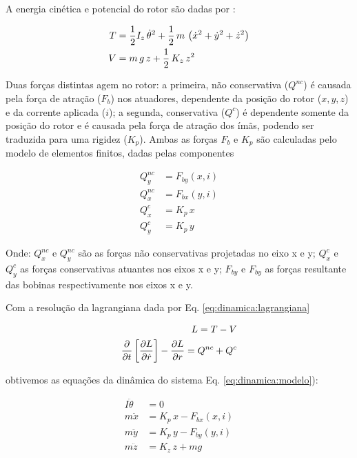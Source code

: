  A energia cinética e potencial do rotor são dadas por :
 
 \begin{align}
 	T &= \frac{1}{2} I_z \, \dot{\theta}^2 + \frac{1}{2} \, m \, \left( \dot{x}^2 + \dot{y}^2 + \dot{z}^2 \right) \notag \\
 	V &= m \, g \, z + \frac{1}{2} \, K_z \, z^2
 \end{align}	
 	
 Duas forças distintas agem no rotor: a primeira, não conservativa ($Q^{nc}$) é causada pela força de atração ($F_b$) nos atuadores, dependente da posição do rotor ($x,y,z$) e da corrente aplicada ($i$); a segunda, conservativa ($Q^{c}$) é dependente somente da posição do rotor e é causada pela força de atração dos ímãs, podendo ser traduzida para uma rigidez ($K_p$). Ambas as forças $F_b$ e $K_p$ são calculadas pelo modelo de elementos finitos, dadas pelas componentes 
	 	
 \begin{align}
 	Q_y^{nc} &= F_{by}(x,i)  \\
 	Q_x^{nc} &= F_{bx}(y,i)  \\
 	Q^{c}_x  &= K_p \, x \\
 	Q^{c}_y  &= K_p \, y 
 \end{align}
 
 Onde: $Q_x^{nc}$ e $Q_y^{nc}$ são as forças não conservativas projetadas no eixo x e y; $Q^{c}_x$ e $Q^{c}_y$ as forças conservativas atuantes nos eixos x e y;  $F_{by}$ e $F_{by}$ as forças resultante das bobinas respectivamente nos eixos x e y.
  
 Com a resolução da lagrangiana dada por Eq. \ref{eq:dinamica:lagrangiana}
  
   \begin{align}
   		L = T - V \notag \\
   		\frac{\partial}{\partial t} \left[ \frac{\partial L}{\partial \dot{r}} \right] -  \frac{\partial L}{\partial r} = Q^{nc} + Q^{c}
   		\label{eq:dinamica:lagrangiana}
   \end{align}
  
obtivemos as equações da dinâmica do sistema Eq. \ref{eq:dinamica:modelo}):
  
 	\begin{align}
 	I \ddot{\theta} &= 0 \\
 	m \ddot{x}		&= K_p \, x  - F_{bx}(x,i) \\
 	m \ddot{y}		&= K_p \, y  - F_{by}(y,i) \label{eq:dinamica:rotor:radial}\\	
 	m \ddot{z}  	&= K_z \, z + m g 
 	\label{eq:dinamica:modelo}
 	\end{align}	
 
